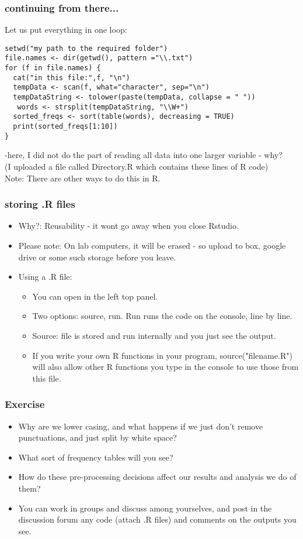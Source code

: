 \documentclass{beamer}
\begin{document}
\begin{frame}[fragile]
\frametitle{continuing from there...}
Let us put everything in one loop: 
\tiny
\begin{verbatim}
setwd("my path to the required folder")
file.names <- dir(getwd(), pattern ="\\.txt")
for (f in file.names) {
  cat("in this file:",f, "\n")
  tempData <- scan(f, what="character", sep="\n")
  tempDataString <- tolower(paste(tempData, collapse = " "))
   words <- strsplit(tempDataString, "\\W+")
  sorted_freqs <- sort(table(words), decreasing = TRUE)
  print(sorted_freqs[1:10])
}
\end{verbatim}
\small -here, I did not do the part of reading all data into one larger variable - why? \\
(I uploaded a file called Directory.R which contains these lines of R code) \\
Note: There are other ways to do this in R. 
\end{frame}

\begin{frame}
\frametitle{storing .R files}
\begin{itemize}
\item Why?: Reusability - it wont go away when you close Rstudio.
\item Please note: On lab computers, it will be erased - so upload to box, google drive or some such storage before you leave.
\item Using a .R file:
\begin{itemize}
\item You can open in the left top panel.
\item Two options: source, run. Run runs the code on the console, line by line.
\item Source: file is stored and run internally and you just see the output. \pause
\item If you write your own R functions in your program, source("filename.R") will also allow other R functions you type in the console to use those from this file.
\end{itemize}
\end{itemize}
\end{frame}

\begin{frame}[fragile]
\frametitle{Exercise}
\begin{itemize}
\item Why are we lower casing, and what happens if we just don't remove punctuations, and just split by white space?
\item What sort of frequency tables will you see? 
\item How do these pre-processing decisions affect our results and analysis we do of them?
\item You can work in groups and discuss among yourselves, and post in the discussion forum any code (attach .R files) and comments on the outputs you see. 
\end{itemize}
\end{frame}
\end{document}
